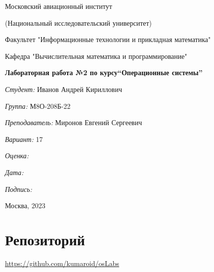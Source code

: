 \documentclass[a4paper, 12pt]{article}
\begin{document}
\thispagestyle{empty}	
\begin{center}
	Московский авиационный институт
	
	(Национальный исследовательский университет)
	
	Факультет "Информационные технологии и прикладная математика"
	
	Кафедра "Вычислительная математика и программирование"
	
\end{center}
\vspace{40ex}
\begin{center}
	\textbf{\large{Лабораторная работа №2 по курсу\linebreak \textquotedblleft Операционные системы\textquotedblright}}
\end{center}
\vspace{35ex}
\begin{flushright}
	\textit{Студент: } Иванов Андрей Кириллович
	
	\vspace{2ex}
	\textit{Группа: } М8О-208Б-22
	
	\vspace{2ex}
	\textit{Преподаватель: } Миронов Евгений Сергеевич
	
	\vspace{2ex}
	\textit{Вариант: } 17
	
	\vspace{2ex}
	\textit{Оценка: } \underline{\quad\quad\quad\quad\quad\quad}
	
	 \vspace{2ex}
	\textit{Дата: } \underline{\quad\quad\quad\quad\quad\quad}
	
	\vspace{2ex}
	\textit{Подпись: } \underline{\quad\quad\quad\quad\quad\quad}
	
\end{flushright}

\vspace{5ex}

\begin{vfill}
	\begin{center}
		Москва, 2023
	\end{center}	
\end{vfill}
\newpage


\begingroup
\color{black}
\tableofcontents\newpage
\endgroup

\section{Репозиторий}
\href{https://github.com/kumaroid/osLabs}{https://github.com/kumaroid/osLabs}
\end{document}
